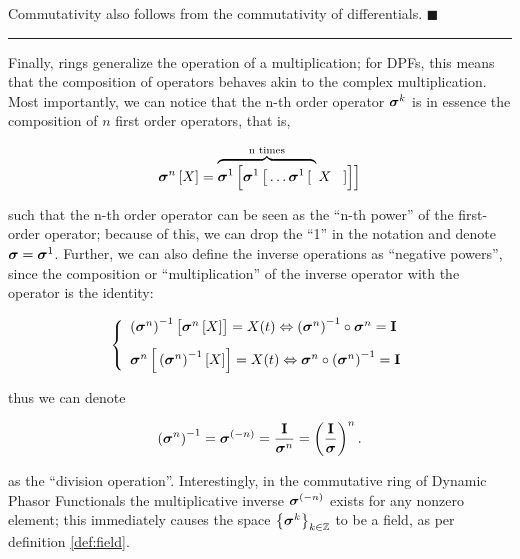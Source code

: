 	Commutativity also follows from the commutativity of differentials.
\hfill$\blacksquare$
\vspace{5mm}
\hrule
\vspace{5mm}%

	Finally, rings generalize the operation of a multiplication; for DPFs, this means that the composition of operators behaves akin to the complex multiplication. Most importantly, we can notice that the n-th order operator $\boldsymbol{\sigma}^{k}$ is in essence the composition of $n$ first order operators, that is,

\begin{equation} \ndpo{n}\left[X\right] = \overbrace{\ndpo{1}\left[\raisebox{4mm}{} \ndpo{1}\left[\raisebox{3mm}{} \dots \ndpo{1}\left[\right.\right.\right.}^{\text{n times}}  X \left. \raisebox{3mm}{} \left. \raisebox{4mm}{} \left. \right]\right]\right] \end{equation}

	\noindent such that the n-th order operator can be seen as the ``n-th power'' of the first-order operator; because of this, we can drop the ``1'' in the notation and denote $\boldsymbol{\sigma} = \boldsymbol{\sigma}^{1}$. Further, we can also define the inverse operations as ``negative powers'', since the composition or ``multiplication'' of the inverse operator with the operator is the identity:

\begin{equation} \left\{\begin{array}{l}
	\left(\ndpo{n}\right)^{-1}\left[\raisebox{3mm}{} \ndpo{n}\left[X\right]\right] = X(t) \Leftrightarrow \left(\ndpo{n}\right)^{-1}\circ \ndpo{n} = \mathbf{I} \\[3mm]
	\ndpo{n}\left[\raisebox{4mm}{} \left(\ndpo{n}\right)^{-1}\left[X\right]\right] = X(t) \Leftrightarrow \ndpo{n}\circ \left(\ndpo{n}\right)^{-1} = \mathbf{I}
\end{array}\right.
\end{equation}

	\noindent thus we can denote

\begin{equation} \left(\boldsymbol{\sigma}^{n}\right)^{-1} = \boldsymbol{\sigma}^{(-n)} = \dfrac{\mathbf{I}}{\boldsymbol{\sigma}^{n}} = \left(\dfrac{\mathbf{I}}{\boldsymbol{\sigma}}\right)^n .\end{equation}

	\noindent as the ``division operation''. Interestingly, in the commutative ring of Dynamic Phasor Functionals the multiplicative inverse $\boldsymbol{\sigma}^{(-n)}$ exists for any nonzero element; this immediately causes the space $\left\{\boldsymbol{\sigma}^{k}\right\}_{k\in\mathbb{Z}}$ to be a field, as per definition \ref{def:field}.


